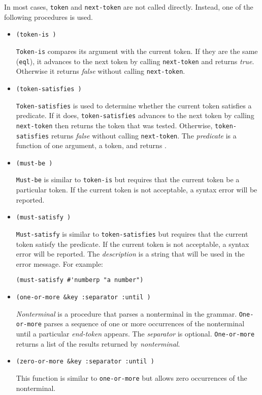 In most cases, {\tt token} and {\tt next-token} are not called
directly.  Instead, one of the following procedures is used.

\begin{itemize}

\item {\tt (token-is )} \MapsTo \bool

{\tt Token-is} compares its argument with the current token.  If they
are the same ({\tt eql}), it advances to the next token by calling
{\tt next-token} and returns {\em true}.  Otherwise it returns
{\em false} without calling {\tt next-token}.

\item {\tt (token-satisfies )} \MapsTo {}

{\tt Token-satisfies} is used to determine whether the current token
satisfies a predicate.  If it does, {\tt token-satisfies} advances to
the next token by calling {\tt next-token} then returns the token that
was tested.  Otherwise, {\tt token-satisfies} returns {\em false}
without calling {\tt next-token}.  The {\em predicate} is a function
of one argument, a token, and returns \bool.

\item {\tt (must-be )} \MapsTo {}

{\tt Must-be} is similar to {\tt token-is} but requires that the current
token be a particular token.  If the current token is not acceptable,
a syntax error will be reported.

\item {\tt (must-satisfy  )}
         \MapsTo {}

{\tt Must-satisfy} is similar to {\tt token-satisfies} but requires
that the current token satisfy the predicate.  If the current token is
not acceptable, a syntax error will be reported.  The {\em description}
is a string that will be used in the error message.  For example:

\verb|(must-satisfy #'numberp "a number")|

\item {\tt (one-or-more 
              \&key :separator 
                    :until )}
      \MapsTo {}

{\em Nonterminal} is a procedure that parses a nonterminal in the
grammar.  {\tt One-or-more} parses a sequence of one or more
occurrences of the nonterminal until a particular {\em end-token\/}
appears.  The {\em separator\/} is optional.  {\tt One-or-more}
returns a list of the results returned by {\em nonterminal}.
                    
\item {\tt (zero-or-more 
              \&key :separator 
                    :until )}
      \MapsTo {}

This function is similar to {\tt one-or-more} but allows zero
occurrences of the nonterminal.
                    
\end{itemize}


